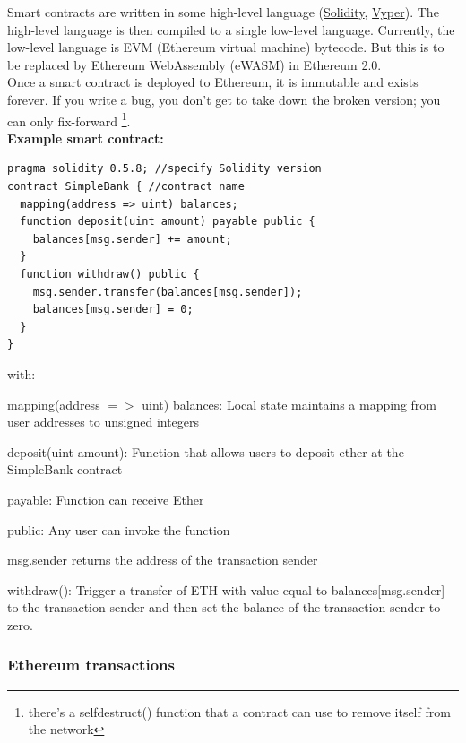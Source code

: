 \documentclass[11pt,oneside,a4paper]{article}
\begin{document}
Smart contracts are written in some high-level language (\href{http://solidity.readthedocs.io}{Solidity}, \href{https://github.com/ethereum/vyper}{Vyper}). The high-level language is then compiled to a single low-level language. Currently, the low-level language is EVM (Ethereum virtual machine) bytecode. But this is to be replaced by Ethereum WebAssembly (eWASM) in Ethereum 2.0.\\
Once a smart contract is deployed to Ethereum, it is immutable and exists forever. If you write a bug, you don’t get to take down the broken version; you can only fix-forward \footnote{there’s a selfdestruct() function that a contract can use to remove itself from the network}.\\

\textbf{Example smart contract:}

\begin{lstlisting}
pragma solidity 0.5.8; //specify Solidity version
contract SimpleBank { //contract name
  mapping(address => uint) balances;
  function deposit(uint amount) payable public {
    balances[msg.sender] += amount;
  }
  function withdraw() public {
    msg.sender.transfer(balances[msg.sender]);
    balances[msg.sender] = 0;
  }
}
\end{lstlisting}

with:

\begin{compactitem}
	\item mapping(address $=>$ uint) balances: Local state maintains a mapping from user addresses to unsigned integers
	\item deposit(uint amount): Function that allows users to deposit ether at the SimpleBank contract
	\item payable: Function can receive Ether
	\item public: Any user can invoke the function
	\item msg.sender returns the address of the transaction sender
	\item withdraw(): Trigger a transfer of ETH with value equal to balances[msg.sender] to the transaction sender and then set the balance of the transaction sender to zero.
\end{compactitem}

\newpage

\subsubsection{Ethereum transactions}
\end{document}
